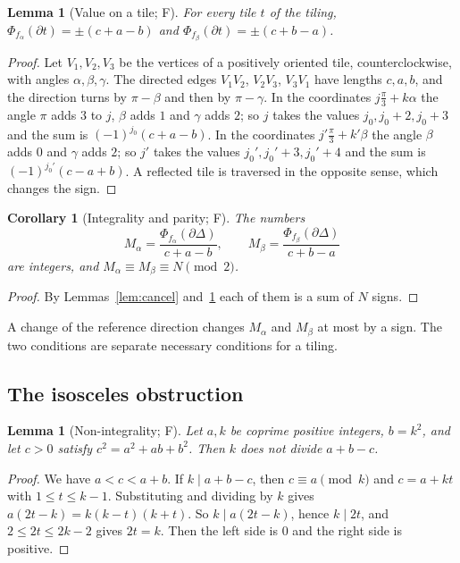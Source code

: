 \documentclass[11pt,reqno]{amsart}
\theoremstyle{plain}
\newtheorem{lemma}[theorem]{Lemma}
\newtheorem{corollary}[theorem]{Corollary}
\theoremstyle{definition}
\newcommand{\sF}{\textup{\textsf{F}}}
\begin{document}
\begin{lemma}[Value on a tile; \sF]\label{lem:value}
For every tile $t$ of the tiling, $\Phi_{f_\alpha}(\partial t)=\pm(c+a-b)$ and
$\Phi_{f_\beta}(\partial t)=\pm(c+b-a)$.
\end{lemma}

\begin{proof}
Let $V_1,V_2,V_3$ be the vertices of a positively oriented tile, counterclockwise, with angles
$\alpha,\beta,\gamma$. The directed edges $V_1V_2$, $V_2V_3$, $V_3V_1$ have lengths $c,a,b$, and the
direction turns by $\pi-\beta$ and then by $\pi-\gamma$. In the coordinates $j\frac\pi3+k\alpha$ the angle
$\pi$ adds $3$ to $j$, $\beta$ adds $1$ and $\gamma$ adds $2$; so $j$ takes the values $j_0,j_0+2,j_0+3$ and
the sum is $(-1)^{j_0}(c+a-b)$. In the coordinates $j'\frac\pi3+k'\beta$ the angle $\beta$ adds $0$ and
$\gamma$ adds $2$; so $j'$ takes the values $j_0',j_0'+3,j_0'+4$ and the sum is $(-1)^{j_0'}(c-a+b)$. A
reflected tile is traversed in the opposite sense, which changes the sign.
\end{proof}

\begin{corollary}[Integrality and parity; \sF]\label{cor:int}
The numbers
\[
M_\alpha=\frac{\Phi_{f_\alpha}(\partial\Delta)}{c+a-b},\qquad
M_\beta=\frac{\Phi_{f_\beta}(\partial\Delta)}{c+b-a}
\]
are integers, and $M_\alpha\equiv M_\beta\equiv N\pmod2$.
\end{corollary}

\begin{proof}
By Lemmas~\ref{lem:cancel} and~\ref{lem:value} each of them is a sum of $N$ signs.
\end{proof}

A change of the reference direction changes $M_\alpha$ and $M_\beta$ at most by a sign. The two conditions
are separate necessary conditions for a tiling.

\subsection{The isosceles obstruction}

\begin{lemma}[Non-integrality; \sF]\label{lem:nonint}
Let $a,k$ be coprime positive integers, $b=k^2$, and let $c>0$ satisfy $c^2=a^2+ab+b^2$. Then $k$ does not
divide $a+b-c$.
\end{lemma}

\begin{proof}
We have $a<c<a+b$. If $k\mid a+b-c$, then $c\equiv a\pmod k$ and $c=a+kt$ with $1\le t\le k-1$. Substituting
and dividing by $k$ gives $a(2t-k)=k(k-t)(k+t)$. So $k\mid a(2t-k)$, hence $k\mid2t$, and $2\le2t\le2k-2$
gives $2t=k$. Then the left side is $0$ and the right side is positive.
\end{proof}
\end{document}
